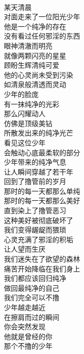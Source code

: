 \begin{poem}[遇见最纯净的自己]
    \begin{multicols}{2}
        \begin{center}~\\
            某天清晨 \\ 对面走来了一位阳光少年 \\ 他是一个纯净的存在 \\ 没有看过任何邪淫的东西 \\ 眼神清澈而明亮 \\ 就像两颗闪亮的星星 \\ 顾盼生辉清纯可爱 \\ 他的心灵尚未受到污染 \\ 如清泉般清透而灵动 \\ 少年的脸庞 \\ 有一抹纯净的光彩 \\ 那么闪耀动人 \\ 仿佛是顶级美钻 \\ 所散发出来的纯净光芒 \\ 看见这位少年 \\ 会触动心底最柔软的部分 \\ 少年带来的纯净气息 \\ 让人瞬间穿越了若干年 \\ 回到了撸管前的岁月 \\ 那时的每一天都那么单纯 \\ 那时的每一天都那么美好 \\ 直到染上了撸管恶习 \\ 这种美好被彻底破坏了 \\ 我们变得龌龊而猥琐 \\ 心灵充满了邪淫的积垢 \\ 让人望而生厌 \\ 我们迷失在了欲望的森林 \\ 痛苦开始降临在我们身上 \\ 我们都应该回归纯净 \\ 做回最纯净的自己 \\ 我们完全可以不撸 \\ 少年越走越近 \\ 在擦肩而过的瞬间 \\ 你会突然发现 \\ 他就是曾经的你 \\ 那个不撸的少年
        \end{center}
    \end{multicols}
\end{poem}
